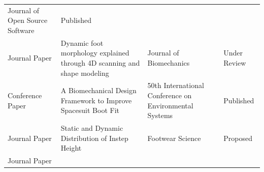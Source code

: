 \documentclass[defaultstyle,11pt]{comps}
\begin{document}
\begin{longtable}[]{@{}llll@{}}
\begin{minipage}[t]{0.22\columnwidth}
Journal of Open Source Software\strut
\end{minipage} & \begin{minipage}[t]{0.22\columnwidth}\raggedright
Published\strut
\end{minipage}\tabularnewline
\begin{minipage}[t]{0.22\columnwidth}\raggedright
Journal Paper\strut
\end{minipage} & \begin{minipage}[t]{0.22\columnwidth}\raggedright
Dynamic foot morphology explained through 4D scanning and shape modeling\strut
\end{minipage} & \begin{minipage}[t]{0.22\columnwidth}\raggedright
Journal of Biomechanics\strut
\end{minipage} & \begin{minipage}[t]{0.22\columnwidth}\raggedright
Under Review\strut
\end{minipage}\tabularnewline
\begin{minipage}[t]{0.22\columnwidth}\raggedright
Conference Paper\strut
\end{minipage} & \begin{minipage}[t]{0.22\columnwidth}\raggedright
A Biomechanical Design Framework to Improve Spacesuit Boot Fit\strut
\end{minipage} & \begin{minipage}[t]{0.22\columnwidth}\raggedright
50th International Conference on Environmental Systems\strut
\end{minipage} & \begin{minipage}[t]{0.22\columnwidth}\raggedright
Published\strut
\end{minipage}\tabularnewline
\begin{minipage}[t]{0.22\columnwidth}\raggedright
Journal Paper\strut
\end{minipage} & \begin{minipage}[t]{0.22\columnwidth}\raggedright
Static and Dynamic Distribution of Instep Height\strut
\end{minipage} & \begin{minipage}[t]{0.22\columnwidth}\raggedright
Footwear Science\strut
\end{minipage} & \begin{minipage}[t]{0.22\columnwidth}\raggedright
Proposed\strut
\end{minipage}\tabularnewline
\begin{minipage}[t]{0.22\columnwidth}\raggedright
Journal Paper\strut

\end{minipage}
\end{longtable}
\end{document}
